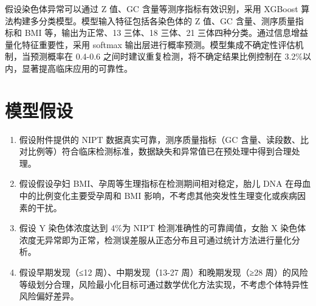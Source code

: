 \documentclass[withoutpreface,bwprint]{cumcmthesis} %
\begin{document}
假设染色体异常可以通过 Z 值、GC 含量等测序指标有效识别，采用 XGBoost 算法构建多分类模型。模型输入特征包括各染色体的 Z 值、GC 含量、测序质量指标和 BMI 等，输出为正常、13 三体、18 三体、21 三体四种分类。通过信息增益量化特征重要性，采用 softmax 输出层进行概率预测。模型集成不确定性评估机制，当预测概率在 0.4-0.6 之间时建议重复检测，将不确定结果比例控制在 3.2\%以内，显著提高临床应用的可靠性。
\section{模型假设}
\begin{enumerate}
    \item 假设附件提供的 NIPT 数据真实可靠，测序质量指标（GC 含量、读段数、比对比例等）符合临床检测标准，数据缺失和异常值已在预处理中得到合理处理。
    \item 假设假设孕妇 BMI、孕周等生理指标在检测期间相对稳定，胎儿 DNA 在母血中的比例变化主要受孕周和 BMI 影响，不考虑其他突发性生理变化或疾病因素的干扰。
    \item 假设 Y 染色体浓度达到 4\%为 NIPT 检测准确性的可靠阈值，女胎 X 染色体浓度无异常即为正常，检测误差服从正态分布且可通过统计方法进行量化分析。
    \item 假设早期发现（≤12 周）、中期发现（13-27 周）和晚期发现（≥28 周）的风险等级划分合理，风险最小化目标可通过数学优化方法实现，不考虑个体特异性风险偏好差异。
\end{enumerate}

\end{document}
